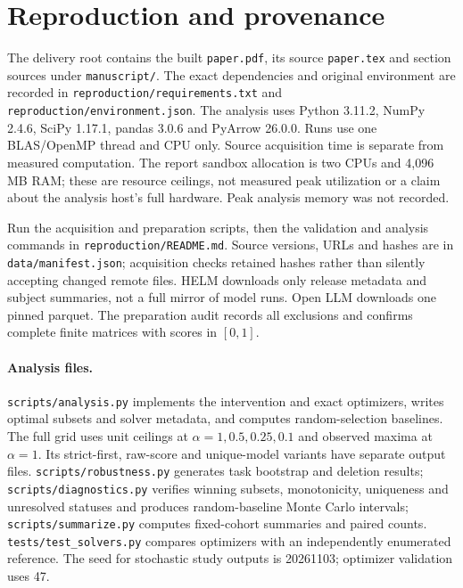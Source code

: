 \section{Reproduction and provenance}
\label{app:repro}
The delivery root contains the built \texttt{paper.pdf}, its source \texttt{paper.tex} and section sources under \texttt{manuscript/}. The exact dependencies and original environment are recorded in \texttt{reproduction/requirements.txt} and \texttt{reproduction/environment.json}. The analysis uses Python 3.11.2, NumPy 2.4.6, SciPy 1.17.1, pandas 3.0.6 and PyArrow 26.0.0. Runs use one BLAS/OpenMP thread and CPU only. Source acquisition time is separate from measured computation. The report sandbox allocation is two CPUs and 4,096 MB RAM; these are resource ceilings, not measured peak utilization or a claim about the analysis host's full hardware. Peak analysis memory was not recorded.

Run the acquisition and preparation scripts, then the validation and analysis commands in \texttt{reproduction/README.md}. Source versions, URLs and hashes are in \texttt{data/manifest.json}; acquisition checks retained hashes rather than silently accepting changed remote files. HELM downloads only release metadata and subject summaries, not a full mirror of model runs. Open LLM downloads one pinned parquet. The preparation audit records all exclusions and confirms complete finite matrices with scores in $[0,1]$.

\paragraph{Analysis files.}
\texttt{scripts/analysis.py} implements the intervention and exact optimizers, writes optimal subsets and solver metadata, and computes random-selection baselines. The full grid uses unit ceilings at $\alpha=1,0.5,0.25,0.1$ and observed maxima at $\alpha=1$. Its strict-first, raw-score and unique-model variants have separate output files. \texttt{scripts/robustness.py} generates task bootstrap and deletion results; \texttt{scripts/diagnostics.py} verifies winning subsets, monotonicity, uniqueness and unresolved statuses and produces random-baseline Monte Carlo intervals; \texttt{scripts/summarize.py} computes fixed-cohort summaries and paired counts. \texttt{tests/test\_solvers.py} compares optimizers with an independently enumerated reference. The seed for stochastic study outputs is 20261103; optimizer validation uses 47.

